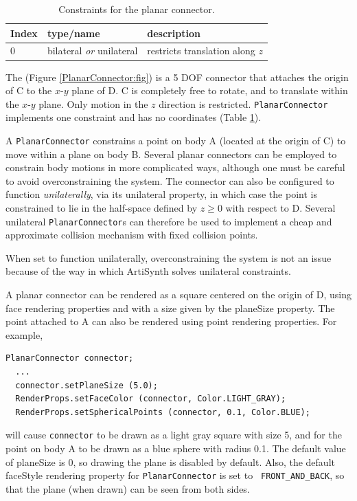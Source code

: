 \begin{table}[h]
\centering
\begin{tabular}{|l|l|l|}
\hline
Index & type/name & description \\
\hline
0 & bilateral {\it or} unilateral & restricts translation along $z$ \\
\hline
\end{tabular}
\caption{Constraints for the planar connector.}
\label{PlanarConnectorConstraints:tbl}
\end{table}

The 
(Figure \ref{PlanarConnector:fig}) is a 5 DOF connector that attaches
the origin of C to the $x$-$y$ plane of D. C is completely free to
rotate, and to translate within the $x$-$y$ plane. Only motion in the
$z$ direction is restricted. {\tt PlanarConnector} implements one
constraint and has no coordinates
(Table \ref{PlanarConnectorConstraints:tbl}).

A {\tt PlanarConnector} constrains a point on body A (located at the
origin of C) to move within a plane on body B. Several planar
connectors can be employed to constrain body motions in more
complicated ways, although one must be careful to avoid
overconstraining the system. The connector can also be configured to
function {\it unilaterally}, via its {\sf unilateral} property, in
which case the point is constrained to lie in the half-space defined by
$z \ge 0$ with respect to D. Several unilateral {\tt PlanarConnector}s
can therefore be used to implement a cheap and approximate collision
mechanism with fixed collision points.

\begin{sideblock}
When set to function unilaterally, overconstraining the system is not
an issue because of the way in which ArtiSynth solves unilateral
constraints.
\end{sideblock}

A planar connector can be rendered as a square centered on the origin
of D, using face rendering properties and with a size given by the
{\sf planeSize} property. The point attached to A can also be rendered
using point rendering properties. For example,
%
\begin{lstlisting}[]
  PlanarConnector connector;
  ...
  connector.setPlaneSize (5.0);
  RenderProps.setFaceColor (connector, Color.LIGHT_GRAY);
  RenderProps.setSphericalPoints (connector, 0.1, Color.BLUE);
\end{lstlisting}
%
will cause {\tt connector} to be drawn as a light gray square with
size 5, and for the point on body A to be drawn as a blue sphere with
radius 0.1. The default value of {\sf planeSize} is 0, so drawing the
plane is disabled by default. Also, the default {\sf faceStyle}
rendering property for {\tt PlanarConnector} is set to {\tt
FRONT\_AND\_BACK}, so that the plane (when drawn) can be seen from
both sides.

